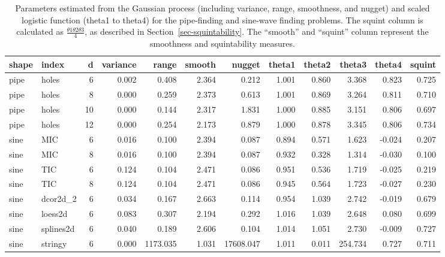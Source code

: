 \documentclass[
  number,
  preprint,
  3p]{elsarticle}
\begin{document}
\begin{longtable}[t]{|>{}ll>{}r|rrr>{}r|rrrr>{}r|}

\caption{\label{tbl-smoothness-squintability}Parameters estimated from
the Gaussian process (including variance, range, smoothness, and nugget)
and scaled logistic function (theta1 to theta4) for the pipe-finding and
sine-wave finding problems. The squint column is calculated as
\(\frac{\theta1 \theta2 \theta3}{4}\), as described in
Section~\ref{sec-squintability}. The ``smooth'' and ``squint'' column
represent the smoothness and squintability measures.}

\tabularnewline

\toprule
shape & index & d & variance & range & smooth & nugget & theta1 & theta2 & theta3 & theta4 & squint\\
\midrule
pipe & holes & 6 & 0.002 & 0.408 & 2.364 & 0.212 & 1.001 & 0.860 & 3.368 & 0.823 & 0.725\\
pipe & holes & 8 & 0.000 & 0.259 & 2.373 & 0.613 & 1.001 & 0.869 & 3.264 & 0.811 & 0.710\\
pipe & holes & 10 & 0.000 & 0.144 & 2.317 & 1.831 & 1.000 & 0.885 & 3.151 & 0.806 & 0.697\\
pipe & holes & 12 & 0.000 & 0.254 & 2.173 & 0.879 & 1.000 & 0.878 & 3.345 & 0.806 & 0.734\\
sine & MIC & 6 & 0.016 & 0.100 & 2.394 & 0.087 & 0.894 & 0.571 & 1.623 & -0.024 & 0.207\\
\addlinespace
sine & MIC & 8 & 0.016 & 0.100 & 2.394 & 0.087 & 0.932 & 0.328 & 1.314 & -0.030 & 0.100\\
sine & TIC & 6 & 0.124 & 0.104 & 2.471 & 0.086 & 0.951 & 0.536 & 1.719 & -0.025 & 0.219\\
sine & TIC & 8 & 0.124 & 0.104 & 2.471 & 0.086 & 0.945 & 0.564 & 1.723 & -0.027 & 0.230\\
sine & dcor2d\_2 & 6 & 0.034 & 0.167 & 2.663 & 0.114 & 0.954 & 1.039 & 2.742 & -0.019 & 0.679\\
sine & loess2d & 6 & 0.083 & 0.307 & 2.194 & 0.292 & 1.016 & 1.039 & 2.648 & 0.080 & 0.699\\
\addlinespace
sine & splines2d & 6 & 0.040 & 0.189 & 2.606 & 0.104 & 1.014 & 1.051 & 2.730 & -0.009 & 0.727\\
sine & stringy & 6 & 0.000 & 1173.035 & 1.031 & 17608.047 & 1.011 & 0.011 & 254.734 & 0.727 & 0.711\\
\bottomrule

\end{longtable}
\end{document}
